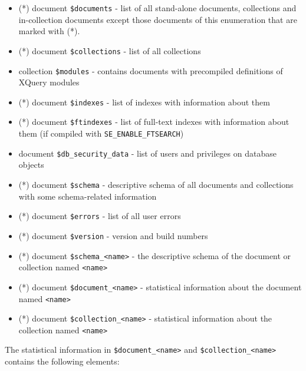 \documentclass[a4paper,12pt]{article}
\begin{document}
\begin{itemize}
\item (*) document \verb!$documents! - list of all stand-alone documents, collections and in-collection documents except those documents of this enumeration that are marked with (*).
\item (*) document \verb!$collections! - list of all collections
\item collection \verb!$modules! - contains documents with precompiled definitions of XQuery modules
\item (*) document \verb!$indexes! - list of indexes with information about them
\item (*) document \verb!$ftindexes! - list of full-text indexes with information about them (if compiled with \verb!SE_ENABLE_FTSEARCH!)
\item document \verb!$db_security_data! - list of users and privileges on database objects
\item (*) document \verb!$schema! - descriptive schema of all documents and collections with some schema-related  information
\item (*) document \verb!$errors! - list of all user errors
\item (*) document \verb!$version! - version and build numbers
\item (*) document \verb!$schema_<name>! - the descriptive schema of the document or collection named \verb!<name>!
\item (*) document \verb!$document_<name>! - statistical information about the document named \verb!<name>!
\item (*) document \verb!$collection_<name>! - statistical information about the collection named \verb!<name>!
\end{itemize}


The statistical information in \verb!$document_<name>! and \verb!$collection_<name>! contains the following elements:
\end{document}

